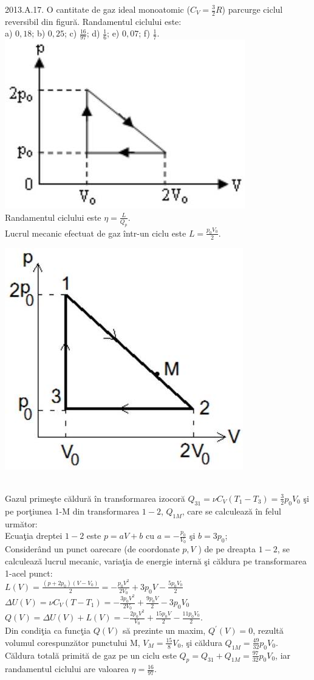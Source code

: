 2013.A.17. O cantitate de gaz ideal monoatomic ($C_{V}=\frac{3}{2} R$) parcurge ciclul reversibil din figură. Randamentul ciclului este:\\ a) $0,18$; b) $0,25$; c) $\frac{16}{97}$; d) $\frac{1}{6}$; e) $0,07$; f) $\frac{1}{7}$.\\ \includegraphics[width=0.4\linewidth]{images/2025_08_19_9e83650bd9c853eca85eg-10}\\ Randamentul ciclului este $\eta=\frac{L}{Q_{p}}$.\\ Lucrul mecanic efectuat de gaz într-un ciclu este $L=\frac{p_{0} V_{0}}{2}$.\\ \begin{center} \includegraphics[width=0.4\linewidth]{images/2025_08_19_9e83650bd9c853eca85eg-10(1)} \end{center}\\ Gazul primeşte căldură în transformarea izocoră $Q_{31}=\nu C_{V}\left(T_{1}-T_{3}\right)=\frac{3}{2} p_{0} V_{0}$ şi pe porţiunea 1-M din transformarea $1-2$, $Q_{1 M}$, care se calculează în felul următor:\\ Ecuaţia dreptei $1-2$ este $p=a V+b$ cu $a=-\frac{p_{0}}{V_{0}}$ şi $b=3 p_{0}$;\\ Considerând un punct oarecare (de coordonate $p, V$ ) de pe dreapta $1-2$, se calculează lucrul mecanic, variaţia de energie internă şi căldura pe transformarea 1-acel punct:\\ $L(V)=\frac{\left(p+2 p_{0}\right)\left(V-V_{0}\right)}{2}=-\frac{p_{0} V^{2}}{2 V_{0}}+3 p_{0} V-\frac{5 p_{0} V_{0}}{2}$\\ $\Delta U(V)=\nu C_{V}\left(T-T_{1}\right)=-\frac{3 p_{0} V^{2}}{2 V_{0}}+\frac{9 p_{0} V}{2}-3 p_{0} V_{0}$\\ $Q(V)=\Delta U(V)+L(V)=-\frac{2 p_{0} V^{2}}{V_{0}}+\frac{15 p_{0} V}{2}-\frac{11 p_{0} V_{0}}{2}$.\\ Din condiţia ca funcţia $Q(V)$ să prezinte un maxim, $Q^{\prime}(V)=0$, rezultă volumul corespunzător punctului $\mathrm{M}$, $V_{M}=\frac{15}{8} V_{0}$, şi căldura $Q_{1 M}=\frac{49}{32} p_{0} V_{0}$.\\ Căldura totală primită de gaz pe un ciclu este $Q_{p}=Q_{31}+Q_{1 M}=\frac{97}{32} p_{0} V_{0}$, iar randamentul ciclului are valoarea $\eta=\frac{16}{97}$.\\

